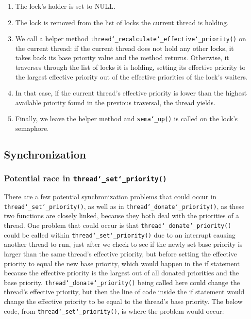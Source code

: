 \documentclass{article}
\renewcommand{\_}{\char`_}
\begin{document}
\begin{enumerate}

\item The lock's holder is set to NULL.

\item The lock is removed from the list of locks the current thread is holding.

\item We call a helper method \texttt{thread\_recalculate\_effective\_priority()} on the current thread: if the current thread does not hold any other locks, it takes back its base priority value and the method returns. Otherwise, it traverses through the list of locks it is holding, setting its effective priority to the largest effective priority out of the effective priorities of the lock's waiters.

\item In that case, if the current thread's effective priority is lower than the highest available priority found in the previous traversal, the thread yields.

\item Finally, we leave the helper method and \texttt{sema\_up()} is called on the lock's semaphore.

\end{enumerate}

\subsection{Synchronization}
\subsubsection{Potential race in \texttt{thread\_set\_priority()}}

There are a few potential synchronization problems that could occur in \texttt{thread\_set\_priority()}, as well as in \texttt{thread\_donate\_priority()}, as these two functions are closely linked, because they both deal with the priorities of a thread. One problem that could occur is that \texttt{thread\_donate\_priority()} could be called within \texttt{thread\_set\_priority()} due to an interrupt causing another thread to run, just after we check to see if the newly set base priority is larger than the same thread's effective priority, but before setting the effective priority to equal the new base priority, which would happen in the if statement because the effective priority is the largest out of all donated priorities and the base priority. \texttt{thread\_donate\_priority()} being called here could change the thread's effective priority, but then the line of code inside the if statement would change the effective priority to be equal to the thread's base priority. The below code, from \texttt{thread\_set\_priority()}, is where the problem would occur:
\end{document}
